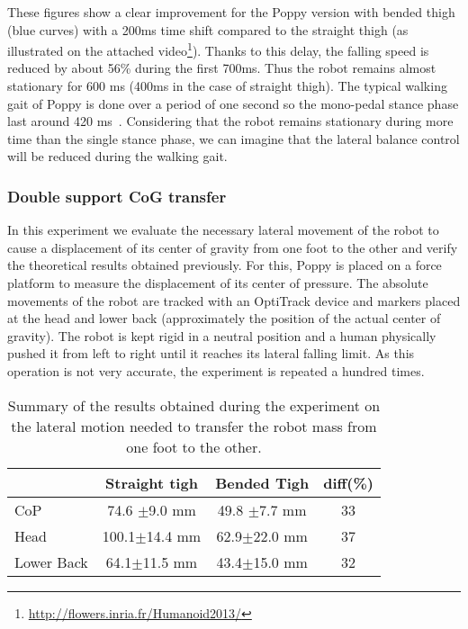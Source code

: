 These figures show a clear improvement for the Poppy version with bended thigh (blue curves) with a 200ms time shift compared to the straight thigh (as illustrated on the attached video\footnote{\url{http://flowers.inria.fr/Humanoid2013/}\label{video}}).
Thanks to this delay, the falling speed is reduced by about 56\% during the first 700ms. Thus the robot remains almost stationary for 600 ms (400ms in the case of straight thigh). The typical walking gait of Poppy is done over a period of one second so the mono-pedal stance phase last around 420 ms~\cite{lapeyre2013poppy}. Considering that the robot remains stationary during more time than the single stance phase, we can imagine that the lateral balance control will be reduced during the walking gait.



\subsubsection{Double support CoG transfer} %
\label{sub:cog_motion}


In this experiment we evaluate the necessary lateral movement of the robot to cause a displacement of its center of gravity from one foot to the other and verify the theoretical results obtained previously. For this, Poppy is placed on a force platform to measure the displacement of its center of pressure. The absolute movements of the robot are tracked with an OptiTrack device and markers placed at the head and lower back (approximately the position of the actual center of gravity). The robot is kept rigid in a neutral position and a human physically pushed it from left to right until it reaches its lateral falling limit. As this operation is not very accurate, the experiment is repeated a hundred times.

\begin{table}[h]
\centering
\begin{tabular}{|l|c|c|c|}
  \hline &      Straight tigh &                     Bended Tigh &                   diff(\%) \\
  \hline CoP & 74.6 {\scriptsize$\pm$9.0} mm &     49.8 {\scriptsize$\pm$7.7} mm & 33\\
  Head & 100.1{\scriptsize$\pm$14.4} mm&     62.9{\scriptsize$\pm$22.0} mm &  37\\
  Lower Back & 64.1{\scriptsize$\pm$11.5} mm&      43.4{\scriptsize$\pm$15.0} mm &  32 \\
  \hline
\end{tabular}
\caption{Summary of the results obtained during the experiment on the lateral motion needed to transfer the robot mass from one foot to the other.}
\label{tab:CoG_motion}
\end{table}

